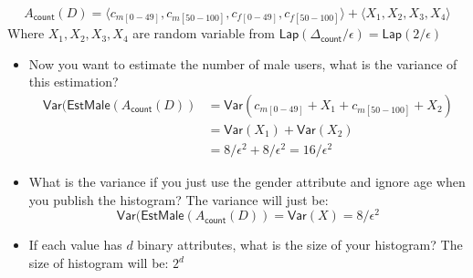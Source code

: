 \documentclass{article}
\begin{document}
\begin{enumerate}
{\begin{equation}
				A_\mathsf{count}(D)=\langle c_{m[0-49]},c_{m[50-100]},c_{f[0-49]},c_{f[50-100]}\rangle + \langle X_1, X_2, X_3, X_4\rangle
		\end{equation}
		Where $X_1,X_2, X_3, X_4$ are random variable from $\mathsf{Lap}(\Delta_\mathsf{count}/\epsilon) = \mathsf{Lap}(2/\epsilon)$
		\begin{itemize}
			\item Now you want to estimate the number of male users, what is the variance of this estimation?
			\begin{equation}
				\begin{split}
				\mathsf{Var}(\mathsf{EstMale}(A_\mathsf{count}(D)) &= \mathsf{Var}(c_{m[0-49]}+X_1 + c_{m[50-100]} + X_2 )
																 \\&= \mathsf{Var}(X_1) + \mathsf{Var}(X_2) 
																 \\&= 8/\epsilon^2 + 8/\epsilon^2 = 16/\epsilon^2
				\end{split}
			\end{equation}
			\item What is the variance if you just use the gender attribute and ignore age when you publish the histogram?
			The variance will just be: 
			\begin{equation}
				\mathsf{Var}(\mathsf{EstMale}(A_\mathsf{count}(D))= \mathsf{Var}(X) = 8/\epsilon^2 				
			\end{equation}

			\item  If each value has $d$ binary attributes, what is the size of your histogram?
			The size of histogram will be: $2^d$
		\end{itemize}


}
\end{enumerate}
\end{document}
